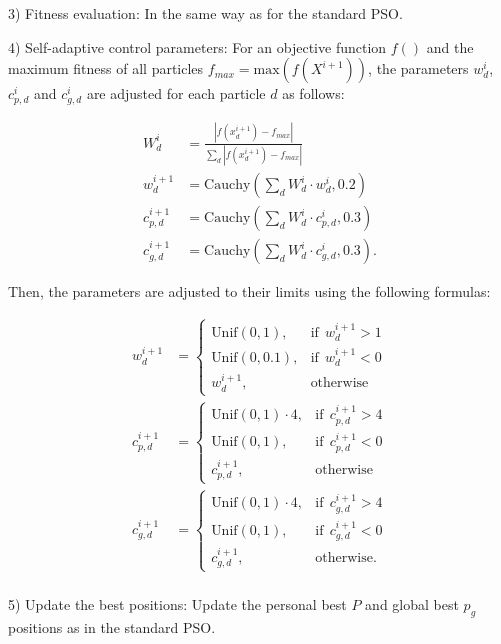\documentclass[
  oneside, a4paper, 12pt, openany]{book}
\theoremstyle{definition}
\theoremstyle{definition}
\theoremstyle{definition}
\theoremstyle{definition}
\theoremstyle{remark}
\begin{document}
3) Fitness evaluation: In the same way as for the standard PSO.

4) Self-adaptive control parameters: For an objective function \(f()\) and the maximum fitness of all particles \(f_{max} = \text{max}(f(X^{i+1}))\), the parameters \(w_d^{i}\), \(c_{p,d}^{i}\) and \(c_{g,d}^{i}\) are adjusted for each particle \(d\) as follows:

\begin{align*}
  W^i_d &= \frac{\left| f(x_d^{i+1})-f_{max} \right|}{\sum_d\left| f(x_d^{i+1})-f_{max} \right|} \\
  w_d^{i+1} &= \text{Cauchy}(\sum_d W^i_d \cdot w_d^{i}, 0.2) \\
  c_{p,d}^{i+1} &= \text{Cauchy}(\sum_d W^i_d \cdot c_{p,d}^{i}, 0.3) \\
  c_{g,d}^{i+1} &= \text{Cauchy}(\sum_d W^i_d \cdot c_{g,d}^{i}, 0.3).
\end{align*}

Then, the parameters are adjusted to their limits using the following formulas:

\begin{align*}
w_d^{i+1} &= 
  \begin{cases}
    \text{Unif}(0,1), & \text{if}\ \ w_d^{i+1} > 1\\
    \text{Unif}(0,0.1), & \text{if}\ \  w_d^{i+1} < 0\\
    w_d^{i+1}, & \text{otherwise}
  \end{cases}\\
c_{p,d}^{i+1} &= 
  \begin{cases}
    \text{Unif}(0,1) \cdot 4, & \text{if}\ \ c_{p,d}^{i+1} > 4\\
    \text{Unif}(0,1), & \text{if}\ \  c_{p,d}^{i+1} < 0\\
    c_{p,d}^{i+1}, & \text{otherwise}
  \end{cases}\\
c_{g,d}^{i+1} &= 
  \begin{cases}
    \text{Unif}(0,1) \cdot 4, & \text{if}\ \ c_{g,d}^{i+1} > 4\\
    \text{Unif}(0,1), & \text{if}\ \  c_{g,d}^{i+1} < 0\\
    c_{g,d}^{i+1}, & \text{otherwise.}
  \end{cases}\\
\end{align*}

5) Update the best positions: Update the personal best \(P\) and global best \(p_g\) positions as in the standard PSO.
\end{document}
